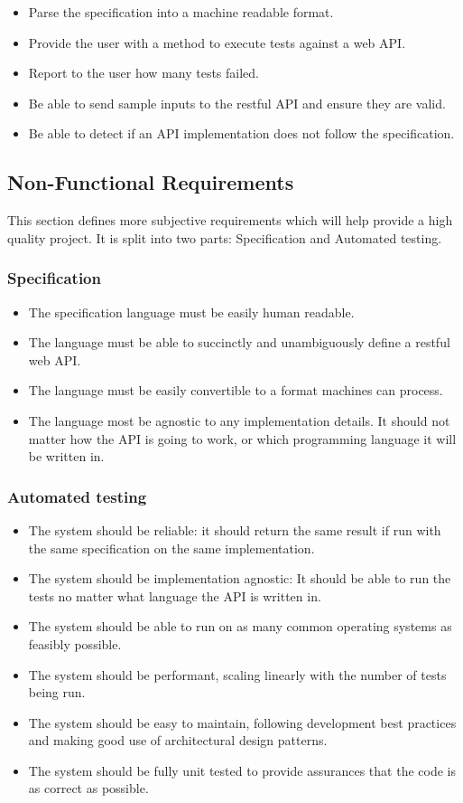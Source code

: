 \begin{itemize}
\item Parse the specification into a machine readable format.
\item Provide the user with a method to execute tests against a web API.
\item Report to the user how many tests failed.
\item Be able to send sample inputs to the restful API and ensure they are valid.
\item Be able to detect if an API implementation does not follow the specification.
\end{itemize}

\subsection{Non-Functional Requirements}

This section defines more subjective requirements which will help provide a high quality project. It is split into two parts: Specification and Automated testing.

\subsubsection{Specification}
\begin{itemize}
\item The specification language must be easily human readable.
\item The language must be able to succinctly and unambiguously define a restful web API.
\item The language must be easily convertible to a format machines can process.
\item The language most be agnostic to any implementation details. It should not matter how the API is going to work, or which programming language it will be written in.
\end{itemize}

\subsubsection{Automated testing}
\begin{itemize}
\item The system should be reliable: it should return the same result if run with the same specification on the same implementation.
\item The system should be implementation agnostic: It should be able to run the tests no matter what language the API is written in.
\item The system should be able to run on as many common operating systems as feasibly possible.
\item The system should be performant, scaling linearly with the number of tests being run.
\item The system should be easy to maintain, following development best practices and making good use of architectural design patterns.
\item The system should be fully unit tested to provide assurances that the code is as correct as possible.
\end{itemize}

